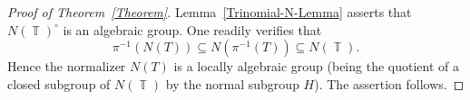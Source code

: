 \documentclass[a4paper,reqno,12pt]{amsart}
\theoremstyle{theorem}
\theoremstyle{definition}
\theoremstyle{theorem}
\theoremstyle{remark}
\DeclareMathOperator{\Aut}{Aut}
\DeclareMathOperator{\TT}{\mathbb T}
\newcommand{\0}{\circ}
\begin{document}
\begin{proof}[Proof of Theorem~\ref{Theorem}]
    Lemma~\ref{Trinomial-N-Lemma} asserts that $N(\TT)^\circ$ is an algebraic group. One readily verifies that $$\pi^{-1}(N(T)) \subseteq N(\pi^{-1}(T)) \subseteq N(\TT).$$ Hence the normalizer $N(T)$ is a locally algebraic group (being the quotient of a closed subgroup of $N(\TT)$ by the normal subgroup $H$). The assertion follows.
\end{proof}

\end{document}
